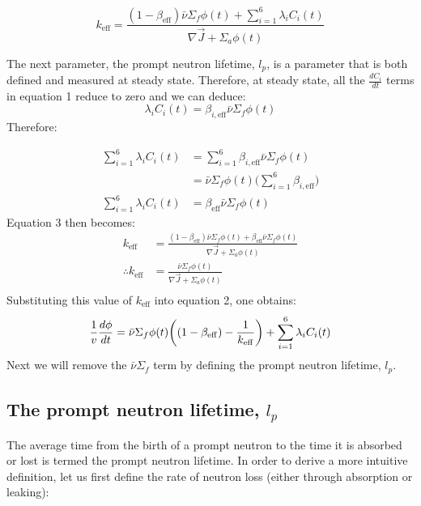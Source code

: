 \documentclass[11pt,letterpaper,titlepage]{article}
\begin{document}
\begin{equation}
	k_{\mathrm{eff}}=\frac{(1-\beta_{\mathrm{eff}})\bar{\nu} \Sigma_f \phi (t) + \sum_{i=1}^6 \lambda_i C_i (t)}{\nabla \vec{J} + \Sigma_a \phi(t)}
\end{equation}

\vspace{0.25cm}\noindent
The next parameter, the prompt neutron lifetime, $l_p$, is a parameter that is both defined and measured at steady state. Therefore, at steady state, all the $\frac{dC_i}{dt}$ terms in equation 1 reduce to zero and we can deduce: 
$$
\lambda_i C_i (t)=\beta_{i,\mathrm{eff}}\bar{\nu} \Sigma_f \phi (t)
$$ 
\noindent
Therefore:

\begin{equation*}
\begin{aligned}
\sum_{i=1}^6 \lambda_i C_i (t) &= \sum_{i=1}^6 \beta_{i,\mathrm{eff}}\bar{\nu} \Sigma_f \phi (t) \\
&=\bar{\nu} \Sigma_f \phi (t) \biggr( \sum_{i=1}^6 \beta_{i,\mathrm{eff}} \biggr) \\
\sum_{i=1}^6 \lambda_i C_i (t) &=\beta_{\mathrm{eff}}\bar{\nu} \Sigma_f \phi (t)
\end{aligned}
\end{equation*}
\noindent
Equation 3 then becomes:
\begin{equation*}
\begin{aligned}
	k_{\mathrm{eff}}&=\frac{(1-\beta_{\mathrm{eff}})\bar{\nu} \Sigma_f \phi (t) + \beta_{\mathrm{eff}}\bar{\nu} \Sigma_f \phi (t)}{\nabla \vec{J} + \Sigma_a \phi(t)} \\
	\therefore k_{\mathrm{eff}} &=\frac{\bar{\nu} \Sigma_f \phi (t) }{\nabla \vec{J} + \Sigma_a \phi(t)} \\
\end{aligned}
\end{equation*}
\noindent
Substituting this value of $k_{\mathrm{eff}}$ into equation 2, one obtains:
\begin{equation}
	\frac{1}{v}\frac{d\phi}{dt}=\bar{\nu} \Sigma_f \phi (t)\biggr((1-\beta_{\mathrm{eff}})-\frac{1}{k_{\mathrm{eff}}}\biggr) + \sum_{i=1}^6 \lambda_i C_i (t) \\
\end{equation}
\noindent
Next we will remove the $\bar{\nu} \Sigma_f$ term by defining the prompt neutron lifetime, $l_p$.

\subsection{The prompt neutron lifetime, $l_p$}
The average time from the birth of a prompt neutron to the time it is absorbed or lost is termed the prompt neutron lifetime. In order to derive a more intuitive definition, let us first define the rate of neutron loss (either through absorption or leaking):
\end{document}
